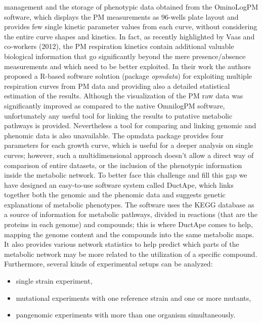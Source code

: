 management and the storage of phenotypic data obtained from the OminoLog\texttrademark PM software, which displays the PM measurements as 96-wells plate layout and provides few single kinetic parameter values from each curve, without considering the entire curve shapes and kinetics. In fact, as recently highlighted by Vaas and co-workers (2012), the PM respiration kinetics contain additional valuable biological information that go significantly beyond the mere presence/absence measurements and which need to be better exploited. In their work the authors proposed a R-based software solution (package \textit{opmdata}) for exploiting multiple respiration curves from PM data and providing also a detailed statistical estimation of the results. Although the visualization of the PM raw data was significantly improved as compared to the native Omnilog\texttrademark PM software, unfortunately any useful tool for linking the results to putative metabolic pathways is  provided. Nevertheless a tool for comparing and linking genomic and phenomic data is also unavailable. The opmdata package provides four parameters for each growth curve, which is useful for a deeper analysis on single curves; however, such a multidimensional approach doesn't allow a direct way of comparison of entire datasets, or the inclusion of the phenotypic information inside the metabolic network. To better face this challenge and fill this gap we have designed an easy-to-use software system called DuctApe, which links together both the genomic and the phenomic data and suggests genetic explanations of metabolic phenotypes. The software uses the KEGG database as a source of information for metabolic pathways, divided in reactions (that are the proteins in each genome) and compounds; this is where DuctApe comes to help, mapping the genome content and the compounds into the same metabolic maps. It also provides various network statistics to help predict which parts of the metabolic network may be more related to the utilization of a specific compound. Furthermore, several kinds of experimental setups can be analyzed: 

\begin{itemize}
\item single strain experiment,
\item mutational experiments with one reference strain and one or more mutants,
\item pangenomic experiments with more than one organism simultaneously.
\end{itemize}

